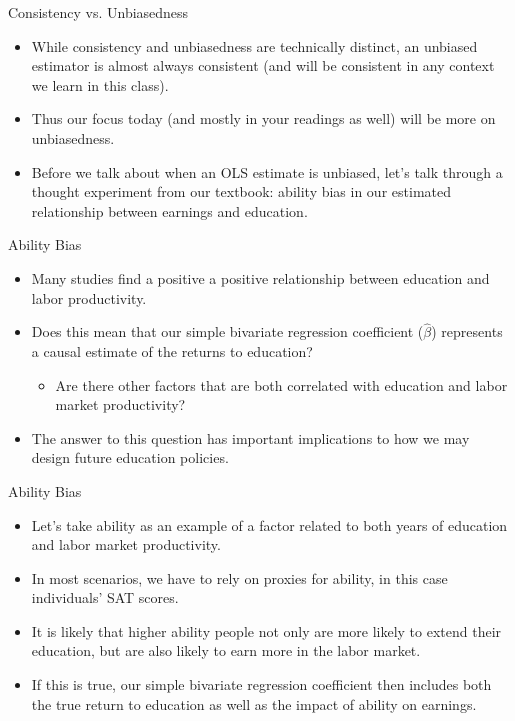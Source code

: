 \documentclass{beamer}
\begin{document}
\begin{frame}{Consistency vs. Unbiasedness}
    \begin{itemize}
        \item While consistency and unbiasedness are technically distinct, an unbiased estimator is almost always consistent (and will be consistent in any context we learn in this class). \medskip
        \item Thus our focus today (and mostly in your readings as well) will be more on unbiasedness. \medskip
        \item Before we talk about when an OLS estimate is unbiased, let's talk through a thought experiment from our textbook: ability bias in our estimated relationship between earnings and education. 
    \end{itemize}
\end{frame}

\begin{frame}{Ability Bias}
    \begin{itemize}
        \item Many studies find a positive a positive relationship between education and labor productivity. \medskip
        \item Does this mean that our simple bivariate regression coefficient ($\hat{\beta}$) represents a causal estimate of the returns to education? 
        \begin{itemize}
        		\item Are there other factors that are both correlated with education and labor market productivity?
        \end{itemize}
        \item The answer to this question has important implications to how we may design future education policies.  
    \end{itemize}
\end{frame}

\begin{frame}{Ability Bias}
    \begin{itemize}
        \item Let's take ability as an example of a factor related to both years of education and labor market productivity. 
        \item In most scenarios, we have to rely on proxies for ability, in this case individuals' SAT scores.  
       	\item It is likely that higher ability people not only are more likely to extend their education, but are also likely to earn more in the labor market. 
	\item If this is true, our simple bivariate regression coefficient then includes both the true return to education as well as the impact of ability on earnings. 
    \end{itemize}
\end{frame}
\end{document}
